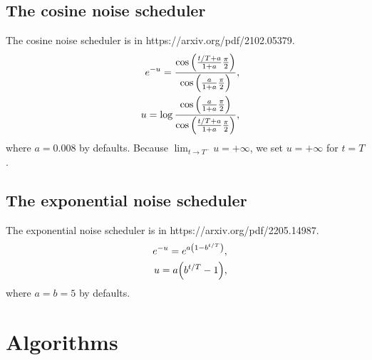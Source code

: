 \documentclass[10pt]{article}
\begin{document}
\subsection{The cosine noise scheduler}
The cosine noise scheduler is in https://arxiv.org/pdf/2102.05379.
\begin{eqnarray*}
  &&e^{-u} = \frac{\cos\qty(\frac{t/T+a}{1+a}\frac{\pi}{2})}{\cos\qty(\frac{a}{1+a}\frac{\pi}{2})},\\
  &&u = \log \frac{\cos\qty(\frac{a}{1+a}\frac{\pi}{2})}{\cos\qty(\frac{t/T+a}{1+a}\frac{\pi}{2})},
\end{eqnarray*}
where $a=0.008$ by defaults. Because $\lim_{t\to T^-}u = +\infty$, we set $u=+\infty$ for $t=T$.

\subsection{The exponential noise scheduler}
The exponential noise scheduler is in https://arxiv.org/pdf/2205.14987.
\begin{eqnarray*}
  &&e^{-u} = e^{a\qty(1-b^{t/T})},\\
  &&u = a\qty(b^{t/T} - 1),
\end{eqnarray*}
where $a=b=5$ by defaults.

\section{Algorithms}
\end{document}
